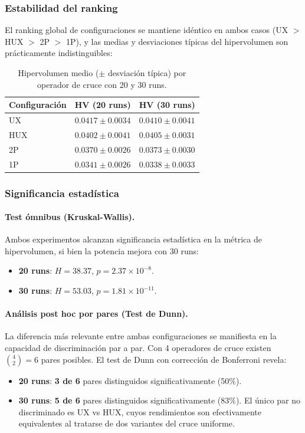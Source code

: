 \documentclass[a4paper,10pt]{article}
\begin{document}
\subsubsection{Estabilidad del ranking}

El ranking global de configuraciones se mantiene idéntico en ambos casos (UX $>$ HUX $>$ 2P $>$ 1P), y las medias y desviaciones típicas del hipervolumen son prácticamente indistinguibles:

\begin{table}[H]
\centering
\begin{tabular}{lcc}
\toprule
\textbf{Configuración} & \textbf{HV (20 runs)} & \textbf{HV (30 runs)} \\
\midrule
UX  & $0.0417 \pm 0.0034$ & $0.0410 \pm 0.0041$ \\
HUX & $0.0402 \pm 0.0041$ & $0.0405 \pm 0.0031$ \\
2P  & $0.0370 \pm 0.0026$ & $0.0373 \pm 0.0030$ \\
1P  & $0.0341 \pm 0.0026$ & $0.0338 \pm 0.0033$ \\
\bottomrule
\end{tabular}
\caption{Hipervolumen medio ($\pm$ desviación típica) por operador de cruce con 20 y 30 runs.}
\label{tab:hv_20vs30}
\end{table}

\subsubsection{Significancia estadística}

\paragraph{Test ómnibus (Kruskal-Wallis).}
Ambos experimentos alcanzan significancia estadística en la métrica de hipervolumen, si bien la potencia mejora con 30 runs:
\begin{itemize}
    \item \textbf{20 runs}: $H = 38.37$, $p = 2.37 \times 10^{-8}$.
    \item \textbf{30 runs}: $H = 53.03$, $p = 1.81 \times 10^{-11}$.
\end{itemize}

\paragraph{Análisis post hoc por pares (Test de Dunn).}
La diferencia más relevante entre ambas configuraciones se manifiesta en la capacidad de discriminación par a par. Con 4 operadores de cruce existen $\binom{4}{2} = 6$ pares posibles. El test de Dunn con corrección de Bonferroni revela:
\begin{itemize}
    \item \textbf{20 runs}: \textbf{3 de 6} pares distinguidos significativamente (50\%).
    \item \textbf{30 runs}: \textbf{5 de 6} pares distinguidos significativamente (83\%). El único par no discriminado es UX vs HUX, cuyos rendimientos son efectivamente equivalentes al tratarse de dos variantes del cruce uniforme.
\end{itemize}
\end{document}
